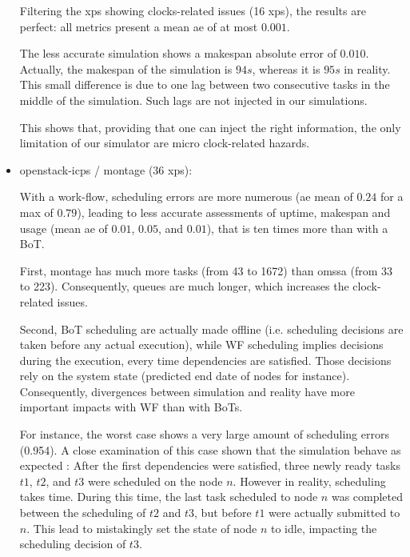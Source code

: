 \documentclass[a4paper,10pt]{article}
\newcommand\vrpath{../../lab/setup/simschlouder/validation-results/}
\begin{document}
\begin{itemize}
      Filtering the xps showing clocks-related issues (16 xps), the results are perfect:
      all metrics present a mean ae of at most $0.001$.
      
      The less accurate simulation shows a makespan absolute error of $0.010$. 
      Actually, the makespan of the simulation is $94s$, whereas it is $95s$ in reality.
      This small difference is due to one lag between two consecutive tasks 
      in the middle of the simulation. Such lags are not injected in our simulations.
      
      This shows that, providing that one can inject the right information, 
      the only limitation of our simulator are micro clock-related hazards.
      
      
 \item openstack-icps / montage (36 xps): 
 
      

      

      With a work-flow, scheduling errors are more numerous 
      (ae mean of $0.24$ for a max of $0.79$), leading to less accurate assessments
      of uptime, makespan and usage (mean ae of $0.01$, $0.05$, and $0.01$), that
      is ten times more than with a BoT.
      
      First, montage has much more tasks (from 43 to 1672) than omssa (from 33 to 223).
      Consequently, queues are much longer, which increases the clock-related issues.
      
      Second, BoT scheduling are actually made offline (i.e. scheduling decisions are taken
      before any actual execution), while WF scheduling implies decisions during 
      the execution, every time dependencies are satisfied. 
      Those decisions rely on the system state (predicted end date of nodes for 
      instance). Consequently, divergences between simulation and reality have
      more important impacts with WF than with BoTs.
      
      
      For instance, the worst case shows a very large amount of scheduling errors 
      (0.954). A close examination of this case shown that the simulation behave
      as expected : After the first dependencies were satisfied,
      three newly ready tasks $t1$, $t2$, and $t3$ were scheduled on the node $n$.
      However in reality, scheduling takes time. During this time, the last task
      scheduled to node $n$ was completed between the scheduling of $t2$ and $t3$, 
      but before $t1$ were actually submitted to $n$. This lead to mistakingly 
      set the state of node $n$ to idle, impacting the scheduling decision of $t3$.
      

\end{itemize}
\end{document}
